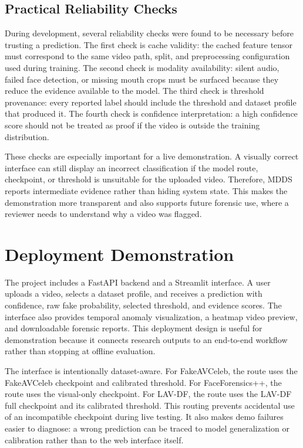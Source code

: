 \documentclass[conference]{IEEEtran}
\begin{document}
\subsection{Practical Reliability Checks}
During development, several reliability checks were found to be necessary before trusting a prediction. The first check is cache validity: the cached feature tensor must correspond to the same video path, split, and preprocessing configuration used during training. The second check is modality availability: silent audio, failed face detection, or missing mouth crops must be surfaced because they reduce the evidence available to the model. The third check is threshold provenance: every reported label should include the threshold and dataset profile that produced it. The fourth check is confidence interpretation: a high confidence score should not be treated as proof if the video is outside the training distribution.

These checks are especially important for a live demonstration. A visually correct interface can still display an incorrect classification if the model route, checkpoint, or threshold is unsuitable for the uploaded video. Therefore, MDDS reports intermediate evidence rather than hiding system state. This makes the demonstration more transparent and also supports future forensic use, where a reviewer needs to understand why a video was flagged.

\section{Deployment Demonstration}
The project includes a FastAPI backend and a Streamlit interface. A user uploads a video, selects a dataset profile, and receives a prediction with confidence, raw fake probability, selected threshold, and evidence scores. The interface also provides temporal anomaly visualization, a heatmap video preview, and downloadable forensic reports. This deployment design is useful for demonstration because it connects research outputs to an end-to-end workflow rather than stopping at offline evaluation.

The interface is intentionally dataset-aware. For FakeAVCeleb, the route uses the FakeAVCeleb checkpoint and calibrated threshold. For FaceForensics++, the route uses the visual-only checkpoint. For LAV-DF, the route uses the LAV-DF full checkpoint and its calibrated threshold. This routing prevents accidental use of an incompatible checkpoint during live testing. It also makes demo failures easier to diagnose: a wrong prediction can be traced to model generalization or calibration rather than to the web interface itself.
\end{document}
